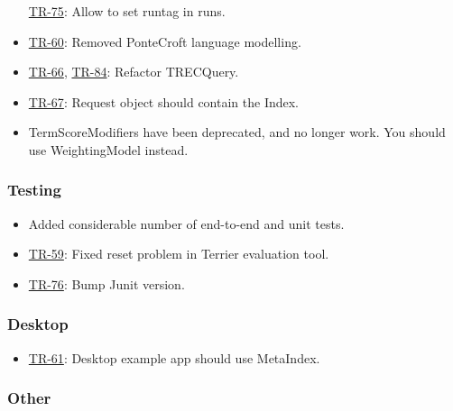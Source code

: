 \begin{itemize}
  \href{http://terrier.org/issues/browse/TR-75}{TR-75}: Allow to set
  runtag in runs.
\item
  \href{http://terrier.org/issues/browse/TR-60}{TR-60}: Removed
  PonteCroft language modelling.
\item
  \href{http://terrier.org/issues/browse/TR-66}{TR-66},
  \href{http://terrier.org/issues/browse/TR-84}{TR-84}: Refactor
  TRECQuery.
\item
  \href{http://terrier.org/issues/browse/TR-67}{TR-67}: Request object
  should contain the Index.
\item
  TermScoreModifiers have been deprecated, and no longer work. You
  should use WeightingModel instead.
\end{itemize}

\subsubsection{Testing}\label{testing-2}

\begin{itemize}
\tightlist
\item
  Added considerable number of end-to-end and unit tests.
\item
  \href{http://terrier.org/issues/browse/TR-59}{TR-59}: Fixed reset
  problem in Terrier evaluation tool.
\item
  \href{http://terrier.org/issues/browse/TR-76}{TR-76}: Bump Junit
  version.
\end{itemize}

\subsubsection{Desktop}\label{desktop-1}

\begin{itemize}
\tightlist
\item
  \href{http://terrier.org/issues/browse/TR-61}{TR-61}: Desktop example
  app should use MetaIndex.
\end{itemize}

\subsubsection{Other}\label{other-4}

